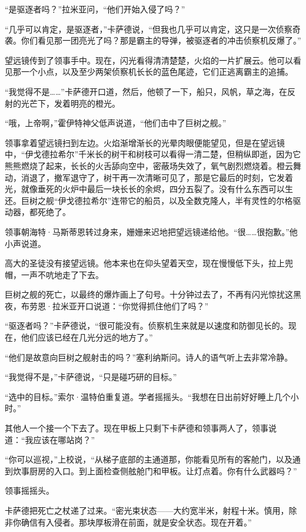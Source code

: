 \documentclass[AutoFakeBold=true]{book}
\begin{document}
``是驱逐者吗？''拉米亚问，``他们开始入侵了吗？''

``几乎可以肯定，是驱逐者，''卡萨德说，``但我也几乎可以肯定，这只是一次侦察奇袭。你们看见那一团亮光了吗？那是霸主的导弹，被驱逐者的冲击侦察机反爆了。''

望远镜传到了领事手中。现在，闪光看得清清楚楚，火焰的一片扩展云。他可以看见那一个小点，以及至少两架侦察机长长的蓝色尾迹，它们正逃离霸主的追捕。

``我觉得不是……''卡萨德开口道，然后，他顿了一下，船只，风帆，草之海，在反射的光芒下，发着明亮的橙光。

``哦，上帝啊，''霍伊特神父低声说道，``他们击中了巨树之舰。''

领事拿着望远镜扫到左边。火焰渐增渐长的光晕肉眼便能望见，但是在望远镜中，``伊戈德拉希尔''千米长的树干和树枝可以看得一清二楚，但稍纵即逝，因为它熊熊燃烧了起来，长长的火舌舔向空中，密蔽场失效了，氧气剧烈燃烧着。橙云舞动，消退了，撤军退守了，树干再一次清晰可见了，那是它最后的时刻，它发着光，就像垂死的火炉中最后一块长长的余烬，四分五裂了。没有什么东西可以生还。巨树之舰``伊戈德拉希尔''连带它的船员，以及全数克隆人，半有灵性的尔格驱动器，都死绝了。

领事朝海特·马斯蒂恩转过身来，姗姗来迟地把望远镜递给他。``很……很抱歉。''他小声说道。

高大的圣徒没有接望远镜。他本来也在仰头望着天空，现在慢慢低下头，拉上兜帽，一声不吭地走了下去。

巨树之舰的死亡，以最终的爆炸画上了句号。十分钟过去了，不再有闪光惊扰这黑夜，布劳恩·拉米亚开口说道：``你觉得抓住他们了吗？''

``驱逐者吗？''卡萨德说，``很可能没有。侦察机生来就是以速度和防御见长的。现在，他们应该已经在几光分远的地方了。''

``他们是故意向巨树之舰射击的吗？''塞利纳斯问。诗人的语气听上去非常冷静。

``我觉得不是，''卡萨德说，``只是碰巧研的目标。''

``选中的目标。''索尔·温特伯重复道。学者摇摇头。``我想在日出前好好睡上几个小时。''

其他人一个接一个下去了。现在甲板上只剩下卡萨德和领事两人了，领事说道：``我应该在哪站岗？''

``你可以巡视，''上校说，``从梯子底部的主通道那，你能看见所有的客舱门，以及通到炊事厨房的入口。到上面检查侧舷舱门和甲板。让灯点着。你有什么武器吗？''

领事摇摇头。

卡萨德把死亡之杖递了过来。``密光束状态——大约宽半米，射程十米。慎用，除非你确信有入侵者。那块厚板滑在前面，就是安全状态。现在开着。''
\end{document}
